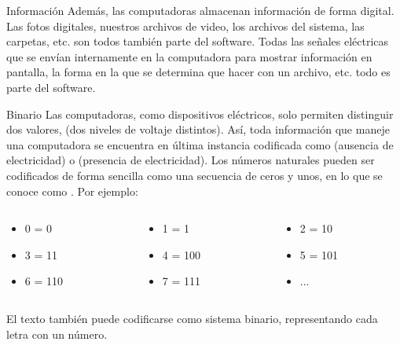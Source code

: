 
\begin{frame}{Información}
  Además, las computadoras almacenan información de forma digital. Las fotos
  digitales, nuestros archivos de video, los archivos del sistema, las carpetas,
  etc. son todos también parte del software.
  \jump
  Todas las señales eléctricas que se envían internamente en la computadora para
  mostrar información en pantalla, la forma en la que se determina que hacer con
  un archivo, etc. todo es parte del software.
\end{frame}


\begin{frame}[shrink]{Binario}
  Las computadoras, como dispositivos eléctricos, solo permiten distinguir
  dos valores,  (dos niveles
  de voltaje distintos).
  \jump
  Así, toda información que maneje una computadora se encuentra en última
  instancia codificada como  (ausencia de electricidad) o
   (presencia de electricidad).
  \jump
  Los números naturales pueden ser codificados de forma sencilla como una
  secuencia de ceros y unos, en lo que se conoce como .
  Por ejemplo:
  \begin{columns}
    \begin{column}{0.33\textwidth}
      \begin{itemize}
        \item 0 = 0
        \item 3 = 11
        \item 6 = 110
      \end{itemize}
    \end{column}
    \begin{column}{0.33\textwidth}
      \begin{itemize}
        \item 1 = 1
        \item 4 = 100
        \item 7 = 111
      \end{itemize}
    \end{column}
    \begin{column}{0.33\textwidth}
      \begin{itemize}
        \item 2 = 10
        \item 5 = 101
        \item ...
      \end{itemize}
    \end{column}
  \end{columns}
  \emptyline
  El texto también puede codificarse como sistema binario, representando cada
  letra con un número.
\end{frame}

